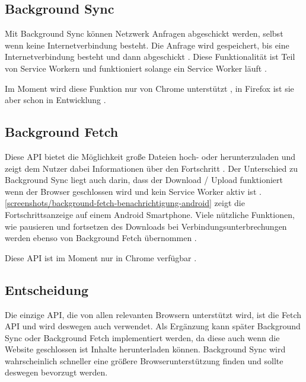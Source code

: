 \subsection{Background Sync}
Mit Background Sync können Netzwerk Anfragen abgeschickt werden, selbst wenn keine Internetverbindung besteht. Die Anfrage wird gespeichert, bis eine Internetverbindung besteht und dann abgeschickt \autocite{wicg-background-sync}. Diese Funktionalität ist Teil von Service Workern und funktioniert solange ein Service Worker läuft \autocite{wicg-background-sync}. 

Im Moment wird diese Funktion nur von Chrome unterstützt \autocite{caniuse-background-sync}, in Firefox ist sie aber schon in Entwicklung \autocite{status-mozilla-background-sync}.

\subsection{Background Fetch}
Diese \ac{API} bietet die Möglichkeit große Dateien hoch- oder herunterzuladen und zeigt dem Nutzer dabei Informationen über den Fortschritt \autocite{google-background-fetch}. Der Unterschied zu Background Sync liegt auch darin, dass der Download / Upload funktioniert wenn der Browser geschlossen wird und kein Service Worker aktiv ist \autocite{google-background-fetch}. \autoref{screenshots/background-fetch-benachrichtigung-android} zeigt die Fortschrittsanzeige auf einem Android Smartphone. Viele nützliche Funktionen, wie pausieren und fortsetzen des Downloads bei Verbindungsunterbrechungen werden ebenso von Background Fetch übernommen \autocite{google-background-fetch}. 


Diese \ac{API} ist im Moment nur in Chrome verfügbar \autocite{google-background-fetch}.

\subsection{Entscheidung}
Die einzige \ac{API}, die von allen relevanten Browsern unterstützt wird, ist die Fetch \ac{API} und wird deswegen auch verwendet. Als Ergänzung kann später Background Sync oder Background Fetch implementiert werden, da diese auch wenn die Website geschlossen ist Inhalte herunterladen können. Background Sync wird wahrscheinlich schneller eine größere Browserunterstützung finden und sollte deswegen bevorzugt werden.

